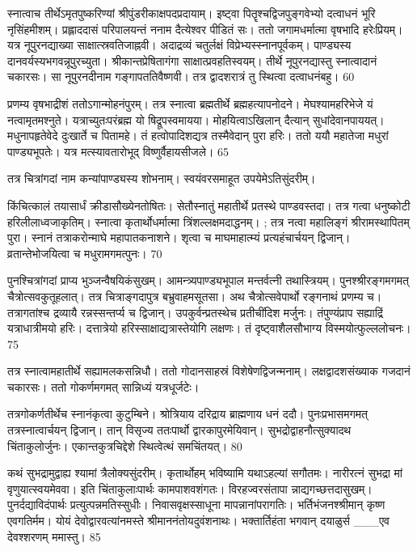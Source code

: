 स्नात्वाच तीर्थेऽमृतपुष्करिण्यां
श्रीपुंडरीकाक्षपदप्रदायाम्।
इष्ट्वा पितॄश्चद्विजपुङ्गवेभ्यो
दत्वाधनं भूरि नृसिंहमीशम्।
प्रह्लाददासं परिपालयन्तं ननाम
दैत्येश्वर पीडितं सः।
ततो जगामधर्मात्मा वृषभादि हरेःप्रियम्।
यत्र नूपुरनद्याख्या साक्षात्स्रवतिजाह्नवी।
अदाद्रव्यं चतुर्लक्षं विप्रेभ्यस्स्नानपूर्वकम्।
पाण्ड्यस्य दानवर्यस्यभगवन्नूपुरच्युता।
श्रीकान्तप्रेषितागंगा साक्षात्प्रवहतिस्वयम्।
तीर्थे नूपुरनद्यास्तु स्नात्वादानं चकारसः।
सा नूपुरनदीनाम गङ्गापततिवैष्णवी।
तत्र द्वादशरात्रं तु स्थित्वा दत्वाधनंबहु।
60

प्रणम्य वृषभाद्रीशं ततोऽगान्मोहनंपुरम्।
तत्र स्नात्वा ब्रह्मतीर्थे ब्रह्महत्यापनोदने।
मेघश्यामहरिभेजे यं नत्वामृतमश्नुते।
यत्राच्युतःपरंब्रह्म यो षिद्रूपस्वमायया।
मोहयित्वाऽखिलान् दैत्यान् सुधांदेवानपाययत्।
मधुनापहृतेवेदे दुःखार्ते च पितामहे।
तं हत्वोपादिशद्यत्र तस्मैवेदान् पुरा हरिः।
ततो ययौ महातेजा मधुरां पाण्ड्यभूपतेः।
यत्र मत्स्यावतारोभूद् विष्णुर्वैहायसीजले।
65

तत्र चित्रांगदां नाम कन्यांपाण्ड्यस्य शोभनाम्।
स्वयंवरसमाहूत उपयेमेऽतिसुंदरीम्।

किंचित्कालं तयासार्धं क्रीडासौख्येनतोषितः।
सेतौस्नातुं महातीर्थे प्रतस्थे पाण्डवस्तदा।
तत्र गत्वा धनुष्कोटी हरिलीलाध्वजाकृतिम्।
स्नात्वा कृतार्थोधर्मात्मा त्रिंशल्लक्षमदाद्धनम्।
; तत्र नत्वा महालिङ्गं श्रीरामस्थापितम् पुरा।
स्नानं तत्राकरोन्माघे महापातकनाशने।
शृत्वा च माघमाहात्म्यं प्रत्यहंचार्चयन् द्विजान्।
व्रतान्तेभोजयित्वा च मधुरामगमत्पुनः।
70

पुनश्चित्रांगदां प्राप्य भुञ्जन्वैषयिकंसुखम्।
आमन्त्र्यपाण्ड्यभूपाल मन्तर्वत्नी तथास्त्रियम्।
पुनश्श्रीरङ्गमगमत् चैत्रोत्सवकुतूहलात्।
तत्र चित्राङ्गदापुत्र बभ्रुवाहमसूतसा।
अथ चैत्रोत्सवेपार्थो रङ्गनाथं प्रणम्य च।
तत्रागतांश्च द्रव्यायै रन्नस्सन्तर्प्य च द्विजान्।
उपकुर्वन्प्रतस्थेच प्रतीचींदिश मर्जुनः।
तंपुण्यंप्राप सह्याद्रिं यत्राधात्रीमयो हरिः।
दत्तात्रेयो हरिस्साक्षाद्यत्रास्तेयोगि लक्षणः।
तं दृष्ट्वाशैलसौभाग्य विस्मयोत्फुल्ललोचनः।
75

तत्र स्नात्वामहातीर्थे सह्यामलकसन्निधौ।
ततो गोदानसाहस्रं विशेषेणद्विजन्मनाम्।
लक्षद्वादशसंख्याक गजदानं चकारसः।
ततो गोकर्णमगमत् सान्निध्यं यत्रधूर्जटेः।

तत्रगोकर्णतीर्थेच स्नानंकृत्वा कुटुम्बिने।
श्रोत्रियाय दरिद्राय ब्राह्मणाय धनं ददौ।
पुनःप्रभासमगमत् तत्रस्नात्वार्चयन् द्विजान्।
तान् विसृज्य ततःपार्थो द्वारकापुरमेयिवान्।
सुभद्रोद्वाहनौत्सुक्यादथ चिंताकुलोर्जुनः।
एकान्तकुत्रचिद्देशे स्थित्वेत्थं समचिंतयत्।
80

कथं सुभद्रामुद्वाह्य श्यामां त्रैलोक्यसुंदरीम्।
कृतार्थोहम् भविष्यामि यथाऽहल्यां सगौतमः।
नारीरत्नं सुभद्रा मां वृणुयात्स्वयमेववा।
इति चिंताकुलाःपार्थः कामपाशवशंगतः।
विरहज्वरसंतापा न्नाद्यगच्छत्तदासुखम्।
पुनर्दद्याविदंपार्थः प्रत्युत्पन्नमतिस्सुधीः।
निवासवृक्षस्साधूना मापन्नानांपरागतिः।
भर्तिभंजनश्श्रीमान् कृष्ण एवगतिर्मम।
योयं देवोद्वारवत्यांनमस्ते श्रीमाननंतोयदुवंशनाथः।
भक्तार्तिहंता भगवान् दयाळुर्स
___एव देवश्शरणम् ममास्तु।
85

